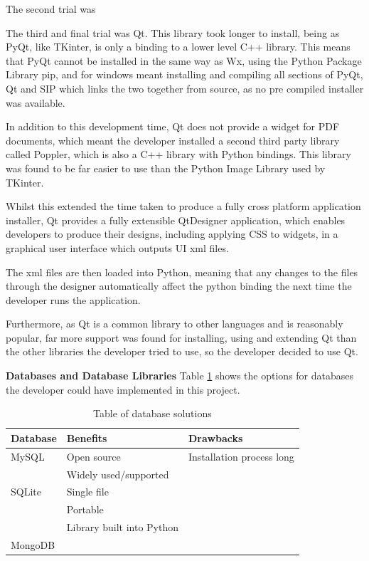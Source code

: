 The second trial was 
 
 The third and final trial was Qt. This library took longer to install, being as PyQt, like TKinter, is only a binding to a lower level C++ library. This means that PyQt cannot be installed in the same way as Wx, using the Python Package Library pip, and for windows meant installing and compiling all sections of PyQt, Qt and SIP which links the two together from source, as no pre compiled installer was available.
 
 In addition to this development time, Qt does not provide a widget for PDF documents, which meant the developer installed a second third party library called Poppler, which is also a C++ library with Python bindings. This library was found to be far easier to use than the Python Image Library used by TKinter.
 
 Whilst this extended the time taken to produce a fully cross platform application installer, Qt provides a fully extensible QtDesigner application, which enables developers to produce their designs, including applying CSS to widgets, in a graphical user interface which outputs UI xml files. 
 
 The xml files are then loaded into Python, meaning that any changes to the files through the designer automatically affect the python binding the next time the developer runs the application.

Furthermore, as Qt is a common library to other languages and is reasonably popular, far more support was found for installing, using and extending Qt than the other libraries the developer tried to use, so the developer decided to use Qt.

\textbf{Databases and Database Libraries}
Table \ref{table:databases} shows the options for databases the developer could have implemented in this project.

\begin{table}[H]
\centering
\begin{tabular}{| l | l | l |} \hline
  {Database} & {Benefits} & {Drawbacks} \\ \hline
  MySQL & Open source & Installation process long \\
  & Widely used/supported \\ \hline
  SQLite & Single file\\
  & Portable\\
  & Library built into Python \\ \hline
  MongoDB & & \\ \hline
  
\end{tabular}
\caption{Table of database solutions}
\label{table:databases}
\end{table}

